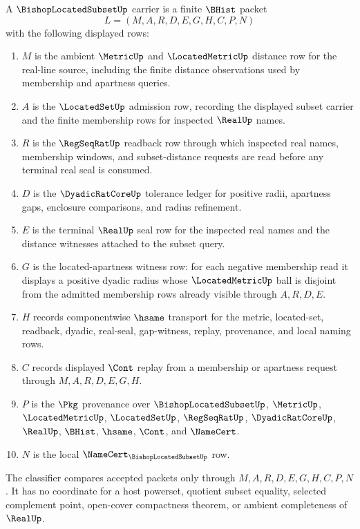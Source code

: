 \begin{definition}
\label{def:bishop-located-subset-carrier}
A $\BishopLocatedSubsetUp$ carrier is a finite $\BHist$ packet
$$
L=(M,A,R,D,E,G,H,C,P,N)
$$
with the following displayed rows:
\begin{enumerate}
\item $M$ is the ambient $\MetricUp$ and $\LocatedMetricUp$ distance row for the real-line source, including the finite distance observations used by membership and apartness queries.
\item $A$ is the $\LocatedSetUp$ admission row, recording the displayed subset carrier and the finite membership rows for inspected $\RealUp$ names.
\item $R$ is the $\RegSeqRatUp$ readback row through which inspected real names, membership windows, and subset-distance requests are read before any terminal real seal is consumed.
\item $D$ is the $\DyadicRatCoreUp$ tolerance ledger for positive radii, apartness gaps, enclosure comparisons, and radius refinement.
\item $E$ is the terminal $\RealUp$ seal row for the inspected real names and the distance witnesses attached to the subset query.
\item $G$ is the located-apartness witness row: for each negative membership read it displays a positive dyadic radius whose $\LocatedMetricUp$ ball is disjoint from the admitted membership rows already visible through $A,R,D,E$.
\item $H$ records componentwise $\hsame$ transport for the metric, located-set, readback, dyadic, real-seal, gap-witness, replay, provenance, and local naming rows.
\item $C$ records displayed $\Cont$ replay from a membership or apartness request through $M,A,R,D,E,G,H$.
\item $P$ is the $\Pkg$ provenance over $\BishopLocatedSubsetUp$, $\MetricUp$, $\LocatedMetricUp$, $\LocatedSetUp$, $\RegSeqRatUp$, $\DyadicRatCoreUp$, $\RealUp$, $\BHist$, $\hsame$, $\Cont$, and $\NameCert$.
\item $N$ is the local $\NameCert_{\BishopLocatedSubsetUp}$ row.
\end{enumerate}
The classifier compares accepted packets only through $M,A,R,D,E,G,H,C,P,N$. It has no coordinate for a host powerset, quotient subset equality, selected complement point, open-cover compactness theorem, or ambient completeness of $\RealUp$.
\end{definition}

